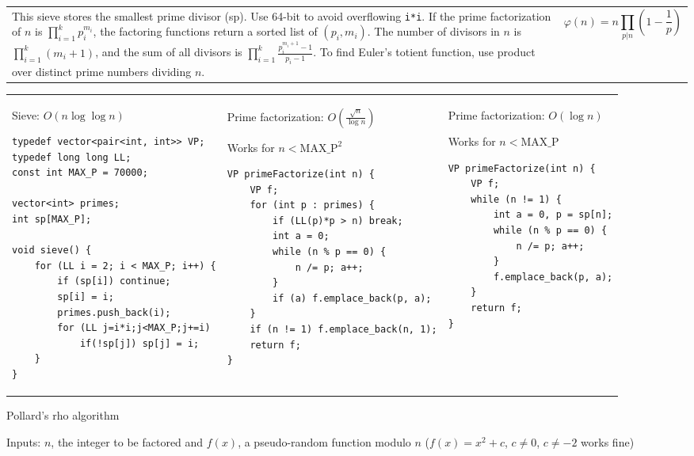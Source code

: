\documentclass[letterpaper]{article}
\begin{document}
\begin{tabular}{@{}p{14cm}p{5cm}@{}}
    This sieve stores the smallest prime divisor (sp). Use 64-bit to avoid overflowing \texttt{i*i}. If the prime factorization of $n$ is $\prod_{i=1}^{k}p_i^{m_i}$, the factoring functions return a sorted list of $(p_i, m_i)$. The number of divisors in $n$ is $\prod_{i=1}^{k}(m_i+1)$, and the sum of all divisors is $\prod_{i=1}^{k}\frac{p_i^{m_i+1}-1}{p_i-1}$. To find Euler's totient function, use product over distinct prime numbers dividing $n$.
     &
    \vspace{-1em}
    $$\varphi(n) = n\prod_{p|n}\left(1-\frac 1p\right)$$
\end{tabular}

\begin{tabular}{@{}p{6.5cm}p{6.5cm}p{6.5cm}@{}}

    Sieve: $O\left(n\log\log n\right)$

    \begin{lstlisting}
typedef vector<pair<int, int>> VP;
typedef long long LL;
const int MAX_P = 70000;

vector<int> primes;
int sp[MAX_P];

void sieve() {
	for (LL i = 2; i < MAX_P; i++) {
		if (sp[i]) continue;
		sp[i] = i;
		primes.push_back(i);
		for (LL j=i*i;j<MAX_P;j+=i)
			if(!sp[j]) sp[j] = i;
	}
}
\end{lstlisting}
     &
    Prime factorization: $O\left(\frac{\sqrt n}{\log n}\right)$

    Works for $n<\mathrm{MAX\_P}^2$
    \begin{lstlisting}
VP primeFactorize(int n) {
	VP f;
	for (int p : primes) {
		if (LL(p)*p > n) break;
		int a = 0;
		while (n % p == 0) {
			n /= p; a++;
		}
		if (a) f.emplace_back(p, a);
	}
	if (n != 1) f.emplace_back(n, 1);
	return f;
}
\end{lstlisting}
     &
    Prime factorization: $O\left(\log n\right)$

    Works for $n<\mathrm{MAX\_P}$
    \begin{lstlisting}
VP primeFactorize(int n) {
	VP f;
	while (n != 1) {
		int a = 0, p = sp[n];
		while (n % p == 0) {
			n /= p; a++;
		}
		f.emplace_back(p, a);
	}
	return f;
}
\end{lstlisting}
\end{tabular}

\vspace{-2em}
Pollard's rho algorithm

Inputs: $n$, the integer to be factored and $f(x)$, a pseudo-random function modulo $n$ ($f(x)=x^2+c$, $c\neq 0$, $c\neq -2$ works fine)
\end{document}
